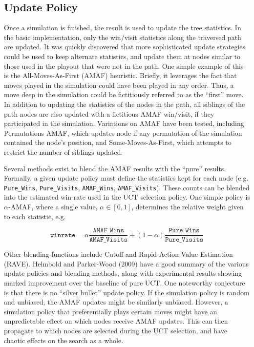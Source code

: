 \documentclass[10pt,a4paper]{report}
\begin{document}
\subsection{Update Policy}
Once a simulation is finished, the result is used to update the tree statistics. In the basic implementation, only the win/visit statistics along the traversed path are updated. It was quickly discovered that more sophisticated update strategies could be used to keep alternate statistics, and update them at nodes similar to those used in the playout that were not in the path. One simple example of this is the All-Moves-As-First (AMAF) heuristic. Briefly, it leverages the fact that moves played in the simulation could have been played in any order. Thus, a move deep in the simulation could be fictitiously referred to as the ``first'' move. In addition to updating the statistics of the nodes in the path, all siblings of the path nodes are also updated with a fictitious AMAF win/visit, if they participated in the simulation. Variations on AMAF have been tested, including Permutations AMAF, which updates node if any permutation of the simulation contained the node's position, and Some-Moves-As-First, which attempts to restrict the number of siblings updated.

Several methods exist to blend the AMAF results with the ``pure'' results. Formally, a given update policy must define the statistics kept for each node (e.g. \texttt{Pure\_Wins}, \texttt{Pure\_Visits}, \texttt{AMAF\_Wins}, \texttt{AMAF\_Visits}). These counts can be blended into the estimated win-rate used in the UCT selection policy. One simple policy is $\alpha$-AMAF, where a single value, $\alpha \in [0, 1]$, determines the relative weight given to each statistic, e.g.

\[
\texttt{winrate} = \alpha\frac{\texttt{AMAF\_Wins}}{\texttt{AMAF\_Visits}} + (1 - \alpha)\frac{\texttt{Pure\_Wins}}{\texttt{Pure\_Visits}}
\]

Other blending functions include Cutoff and Rapid Action Value Estimation (RAVE). Helmbold and Parker-Wood (2009) have a good summary of the various update policies and blending methods, along with experimental results showing marked improvement over the baseline of pure UCT\cite{helmbold2009all}. One noteworthy conjecture is that there is no ``silver bullet'' update policy. If the simulation policy is random and unbiased, the AMAF updates might be similarly unbiased. However, a simulation policy that preferentially plays certain moves might have an unpredictable effect on which nodes receive AMAF updates. This can then propagate to which nodes are selected during the UCT selection, and have chaotic effects on the search as a whole. 
\end{document}
